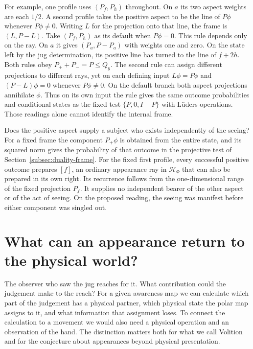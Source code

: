 \documentclass[11pt]{article}
\theoremstyle{definition}
\begin{document}
For example, one profile uses $(P_f,P_h)$ throughout. On $a$ its two aspect weights are each $1/2$. A second profile takes the positive aspect to be the line of $P\phi$ whenever $P\phi\ne0$. Writing $L$ for the projection onto that line, the frame is $(L,P-L)$. Take $(P_f,P_h)$ as its default when $P\phi=0$. This rule depends only on the ray. On $a$ it gives $(P_a,P-P_a)$ with weights one and zero. On the state left by the jug determination, its positive line has turned to the line of $f+2h$. Both rules obey $P_++P_-=P\le Q_y$. The second rule can assign different projections to different rays, yet on each defining input $L\phi=P\phi$ and $(P-L)\phi=0$ whenever $P\phi\ne0$. On the default branch both aspect projections annihilate $\phi$. Thus on its own input the rule gives the same outcome probabilities and conditional states as the fixed test $\{P,0,I-P\}$ with L\"uders operations. Those readings alone cannot identify the internal frame.

Does the positive aspect supply a subject who exists independently of the seeing? For a fixed frame the component $P_+\phi$ is obtained from the entire state, and its squared norm gives the probability of that outcome in the projective test of Section~\ref{subsec:duality-frame}. For the fixed first profile, every successful positive outcome prepares $[f]$, an ordinary appearance ray in $\mathcal H_\Phi$ that can also be prepared in its own right. Its recurrence follows from the one-dimensional range of the fixed projection $P_f$. It supplies no independent bearer of the other aspect or of the act of seeing. On the proposed reading, the seeing was manifest before either component was singled out.

\section{What can an appearance return to the physical world?}
\label{sec:volition-admissibility}

The observer who saw the jug reaches for it. What contribution could the judgement make to the reach? For a given awareness map we can calculate which part of the judgement has a physical partner, which physical state the polar map assigns to it, and what information that assignment loses. To connect the calculation to a movement we would also need a physical operation and an observation of the hand. The distinction matters both for what we call Volition and for the conjecture about appearances beyond physical presentation.
\end{document}
